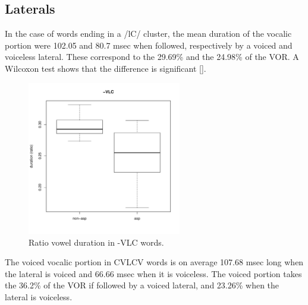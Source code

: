 \documentclass[11pt,a4paper,openany]{memoir}\usepackage[]{graphicx}\usepackage[]{color}
\newenvironment{knitrout}{}{} %
\begin{document}
\subsection{Laterals}


In the case of words ending in a /lC/ cluster, the mean duration of the vocalic portion were 102.05 and 80.7 msec when followed, respectively by a voiced and voiceless lateral.
These correspond to the 29.69\% and the 24.98\% of the VOR.
A Wilcoxon test shows that the difference is significant [].

\begin{figure}
\centering
\begin{knitrout}
\color{fgcolor}
\includegraphics[width=0.6\textwidth]{img/mono-lat-box-1} 

\end{knitrout}
\caption{Ratio vowel duration in -VLC words.}
\label{f:monolat}
\end{figure}



The voiced vocalic portion in CVLCV words is on average 107.68 msec long when the lateral is voiced and 66.66 msec when it is voiceless.
The voiced portion takes the 36.2\% of the VOR if followed by a voiced lateral, and 23.26\% when the lateral is voiceless.
\end{document}
